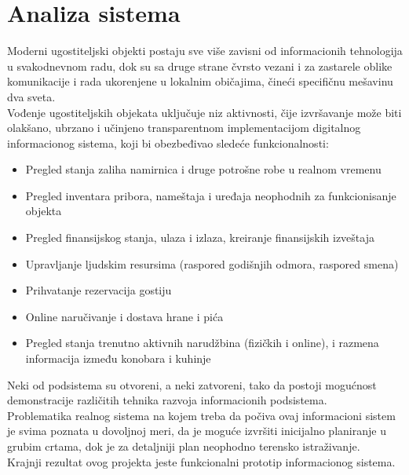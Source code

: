 \documentclass{article}
\begin{document}
\section{Analiza sistema}

Moderni ugostiteljski objekti postaju sve više zavisni od informacionih tehnologija u svakodnevnom radu, dok su sa druge strane čvrsto vezani i za zastarele oblike komunikacije i rada ukorenjene u lokalnim običajima, čineći specifičnu
mešavinu dva sveta.\\

Vođenje ugostiteljskih objekata uključuje niz aktivnosti, čije izvršavanje može biti olakšano, ubrzano i učinjeno transparentnom implementacijom digitalnog informacionog sistema, koji bi obezbeđivao sledeće funkcionalnosti:\\

\begin{itemize}
\item Pregled stanja zaliha namirnica i druge potrošne robe u realnom vremenu
\item Pregled inventara pribora, nameštaja i uređaja neophodnih za funkcionisanje objekta
\item Pregled finansijskog stanja, ulaza i izlaza, kreiranje finansijskih izveštaja
\item Upravljanje ljudskim resursima (raspored godišnjih odmora, raspored smena)
\item Prihvatanje rezervacija gostiju
\item Online naručivanje i dostava hrane i pića
\item Pregled stanja trenutno aktivnih narudžbina (fizičkih i online), i razmena informacija između konobara i kuhinje
\end{itemize}

Neki od podsistema su otvoreni, a neki zatvoreni, tako da postoji mogućnost demonstracije različitih tehnika razvoja
informacionih podsistema.\\

Problematika realnog sistema na kojem treba da počiva ovaj informacioni sistem je svima poznata u dovoljnoj meri, da je moguće izvršiti inicijalno planiranje u grubim crtama, dok je za detaljniji plan neophodno terensko istraživanje.\\

Krajnji rezultat ovog projekta jeste funkcionalni prototip informacionog sistema.\\
\end{document}
